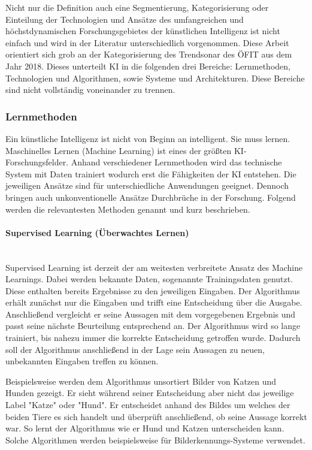 \documentclass[a4paper,12pt, german]{report}
\begin{document}
Nicht nur die Definition auch eine Segmentierung, Kategorisierung oder Einteilung der Technologien und Ansätze des umfangreichen und höchstdynamischen Forschungsgebietes der künstlichen Intelligenz ist nicht einfach und wird in der Literatur unterschiedlich vorgenommen. Diese Arbeit orientiert sich grob an der Kategorisierung des Trendsonar des ÖFIT aus dem Jahr 2018. Dieses unterteilt KI in die folgenden drei Bereiche: Lernmethoden, Technologien und Algorithmen, sowie Systeme und Architekturen. \cite{10}
Diese Bereiche sind nicht vollständig voneinander zu trennen.  

\subsubsection{Lernmethoden}
Ein künstliche Intelligenz ist nicht von Beginn an intelligent. Sie muss lernen. Maschinelles Lernen (Machine Learning) ist eines der größten KI-Forschungsfelder. Anhand verschiedener Lernmethoden wird das technische System mit Daten trainiert wodurch erst die Fähigkeiten der KI entstehen. Die jeweiligen Ansätze sind für unterschiedliche Anwendungen geeignet. Dennoch bringen auch unkonventionelle Ansätze Durchbrüche in der Forschung. Folgend werden die relevantesten Methoden genannt und kurz beschrieben. \cite{10}


\paragraph{Supervised Learning (Überwachtes Lernen)} $ $ \\ Supervised Learning ist derzeit der am weitesten verbreitete Ansatz des Machine Learnings. Dabei werden bekannte Daten, sogenannte Trainingsdaten genutzt. Diese enthalten bereits Ergebnisse zu den jeweiligen Eingaben. Der Algorithmus erhält zunächst nur die Eingaben und trifft eine Entscheidung über die Ausgabe. Anschließend vergleicht er seine Aussagen mit dem vorgegebenen Ergebnis und passt seine nächste Beurteilung entsprechend an. Der Algorithmus wird so lange trainiert, bis nahezu immer die korrekte Entscheidung getroffen wurde. Dadurch soll der Algorithmus anschließend in der Lage sein Aussagen zu neuen, unbekannten Eingaben treffen zu können.\cite{01}\cite{05}

Beispielsweise werden dem Algorithmus unsortiert Bilder von Katzen und Hunden gezeigt. Er sieht während seiner Entscheidung aber nicht das jeweilige Label "Katze" oder "Hund". Er entscheidet anhand des Bildes um welches der beiden Tiere es sich handelt und überprüft anschließend, ob seine Aussage korrekt war. So lernt der Algorithmus wie er Hund und Katzen unterscheiden kann. Solche Algorithmen werden beispielsweise für Bilderkennungs-Systeme verwendet. 
\end{document}
